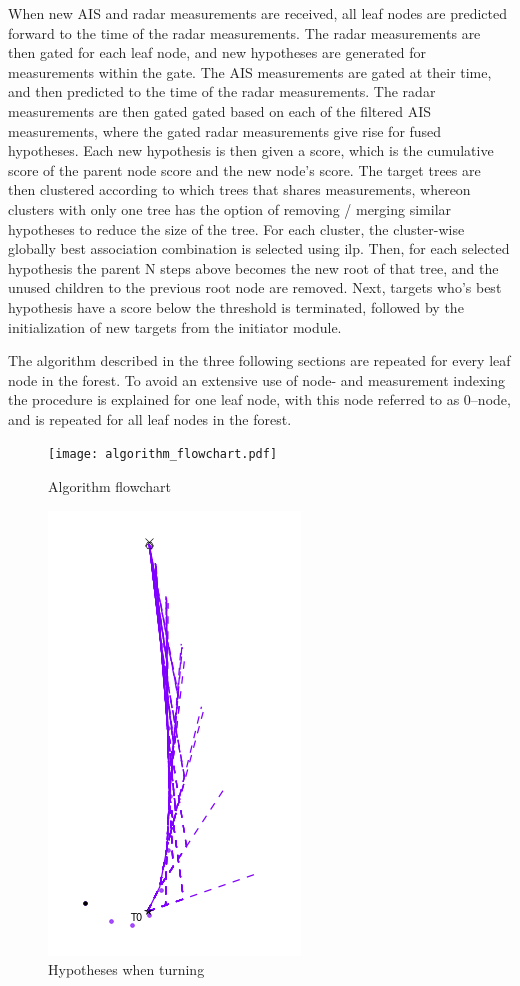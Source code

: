  When new 	AIS and radar measurements are received, all leaf nodes are predicted forward to the time of the radar measurements. The radar measurements are then gated for each leaf node, and new hypotheses are generated for measurements within the gate. The AIS measurements are gated at their time, and then predicted to the time of the radar measurements. The radar measurements are then gated gated based on each of the filtered AIS measurements, where the gated radar measurements give rise for fused hypotheses. Each new hypothesis is then given a score, which is the cumulative score of the parent node score and the new node's score. The target trees are then clustered according to which trees that shares measurements, whereon clusters with only one tree has the option of removing / merging similar hypotheses to reduce the size of the tree. For each cluster, the cluster-wise globally best association combination is selected using \gls{ilp}. Then, for each selected hypothesis the parent N steps above becomes the new root of that tree, and the unused children to the previous root node are removed. Next, targets who's best hypothesis have a score below the threshold is terminated, followed by the initialization of new targets from the initiator module. 

 The algorithm described in the three following  sections are repeated for every leaf node in the forest. To avoid an extensive use of node- and measurement indexing the procedure is explained for one leaf node, with this node referred to as 0--node, and is repeated for all leaf nodes in the forest. 
\begin{figure}
\centering
\texttt{[image: algorithm\_flowchart.pdf]}
\caption{Algorithm flowchart}\label{fig:algorithm_flow}
\end{figure}

\begin{figure}[H]
\centering
\includegraphics[height = .4\textheight]{Figures/Hypotheses_when_turning.PNG}
\caption{Hypotheses when turning}\label{fig:hypotheses_when_turning}
\end{figure}

